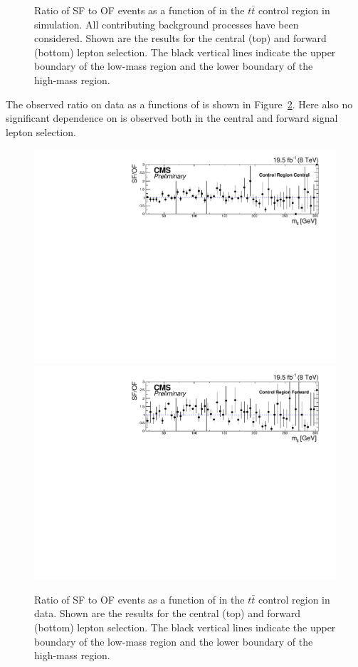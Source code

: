 \begin{figure}
\begin{center}
\caption{Ratio of SF to OF events as a function of \mll in the $t\bar{t}$ control region in simulation. All contributing background processes have been considered. Shown are the results for the central (top) and forward (bottom) lepton selection. The black vertical lines indicate the upper boundary of the low-mass region and the lower boundary of the high-mass region.}
\label{fig:controlRatioMC}
\end{center}
\end{figure}
The observed ratio on data as a functions of \mll is shown in Figure~\ref{fig:controlRatio}. Here also no significant dependence on \mll is observed both in the central and forward signal lepton selection.
\begin{figure}
\begin{center}
\includegraphics[scale=0.4]{plots/BG/control/rSFOF_ControlCentral_Full2012_Mll_None.pdf}\\
\includegraphics[scale=0.4]{plots/BG/control/rSFOF_ControlForward_Full2012_Mll_None.pdf}
\caption{Ratio of SF to OF events as a function of \mll in the $t\bar{t}$ control region in data. Shown are the results for the central (top) and forward (bottom) lepton selection. The black vertical lines indicate the upper boundary of the low-mass region and the lower boundary of the high-mass region.}
\label{fig:controlRatio}
\end{center}
\end{figure}
